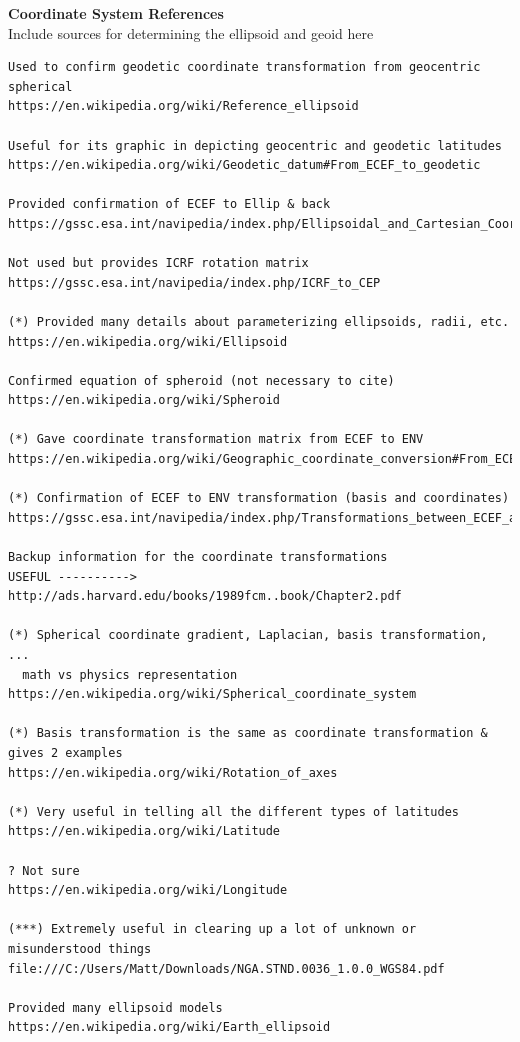 \documentclass[11pt,dvipsnames]{thesis}
\begin{document}
{\centering\textbf{\Large Coordinate System References}}\\
Include sources for determining the ellipsoid and geoid here
\begin{verbatim}
Used to confirm geodetic coordinate transformation from geocentric spherical
https://en.wikipedia.org/wiki/Reference_ellipsoid

Useful for its graphic in depicting geocentric and geodetic latitudes
https://en.wikipedia.org/wiki/Geodetic_datum#From_ECEF_to_geodetic

Provided confirmation of ECEF to Ellip & back
https://gssc.esa.int/navipedia/index.php/Ellipsoidal_and_Cartesian_Coordinates_Conversion

Not used but provides ICRF rotation matrix
https://gssc.esa.int/navipedia/index.php/ICRF_to_CEP

(*) Provided many details about parameterizing ellipsoids, radii, etc.
https://en.wikipedia.org/wiki/Ellipsoid

Confirmed equation of spheroid (not necessary to cite)
https://en.wikipedia.org/wiki/Spheroid

(*) Gave coordinate transformation matrix from ECEF to ENV
https://en.wikipedia.org/wiki/Geographic_coordinate_conversion#From_ECEF_to_ENU

(*) Confirmation of ECEF to ENV transformation (basis and coordinates)
https://gssc.esa.int/navipedia/index.php/Transformations_between_ECEF_and_ENU_coordinates

Backup information for the coordinate transformations
USEFUL ----------> http://ads.harvard.edu/books/1989fcm..book/Chapter2.pdf

(*) Spherical coordinate gradient, Laplacian, basis transformation, ...
  math vs physics representation
https://en.wikipedia.org/wiki/Spherical_coordinate_system

(*) Basis transformation is the same as coordinate transformation & gives 2 examples
https://en.wikipedia.org/wiki/Rotation_of_axes

(*) Very useful in telling all the different types of latitudes
https://en.wikipedia.org/wiki/Latitude

? Not sure
https://en.wikipedia.org/wiki/Longitude

(***) Extremely useful in clearing up a lot of unknown or misunderstood things
file:///C:/Users/Matt/Downloads/NGA.STND.0036_1.0.0_WGS84.pdf

Provided many ellipsoid models
https://en.wikipedia.org/wiki/Earth_ellipsoid


\end{verbatim}
\end{document}
